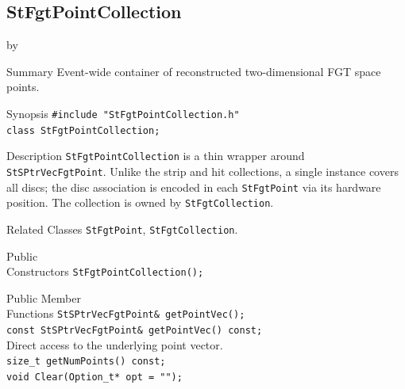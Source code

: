 \documentclass[twoside]{article}
\newcommand{\entrylabel}[1]{\mbox{\textbf{{#1}}}\hfil}%
\newenvironment{entry}
{\begin{list}{}%
    {\renewcommand{\makelabel}{\entrylabel}%
     \setlength{\labelwidth}{90pt}%
     \setlength{\leftmargin}{\labelwidth}
     \advance\leftmargin by \labelsep%
      }%
    }%
  {\end{list}}
\newcommand{\Entrylabel}[1]%
{\raisebox{0pt}[1ex][0pt]{\makebox[\labelwidth][l]%
    {\parbox[t]{\labelwidth}{\hspace{0pt}\textbf{{#1}}}}}}
\newenvironment{Entry}%
{\renewcommand{\entrylabel}{\Entrylabel}\begin{entry}}%
  {\end{entry}}
\begin{document}
\subsection{StFgtPointCollection}
\label{sec:StFgtPointCollection}
\begin{Entry}
\item[Summary] Event-wide container of reconstructed two-dimensional FGT space points.
\item[Synopsis]
    \verb+#include "StFgtPointCollection.h"+\\
    \verb+class StFgtPointCollection;+\\
\item[Description]
  \texttt{StFgtPointCollection} is a thin wrapper around \texttt{StSPtrVecFgtPoint}.
  Unlike the strip and hit collections, a single instance covers all discs; the disc
  association is encoded in each \texttt{StFgtPoint} via its hardware position.  The
  collection is owned by \texttt{StFgtCollection}.
\item[Related Classes]
  \texttt{StFgtPoint}, \texttt{StFgtCollection}.
\item[Public\\ Constructors]
    \verb+StFgtPointCollection();+\\
\item[Public Member\\ Functions]
    \verb+StSPtrVecFgtPoint& getPointVec();+\\
    \verb+const StSPtrVecFgtPoint& getPointVec() const;+\\
    Direct access to the underlying point vector.\\[2pt]
    \verb+size_t getNumPoints() const;+\\
    \verb+void Clear(Option_t* opt = "");+\\
\end{Entry}
\clearpage
\end{document}
